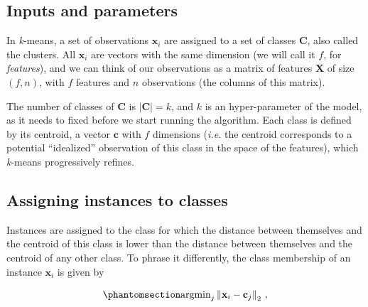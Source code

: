\documentclass[
  letterpaper,
]{scrbook}
\begin{document}
\subsection{Inputs and parameters}\label{inputs-and-parameters}


In \emph{k}-means, a set of observations \(\mathbf{x}_i\) are assigned
to a set of classes \(\mathbf{C}\), also called the clusters. All
\(\mathbf{x}_i\) are vectors with the same dimension (we will call it
\(f\), for \emph{features}), and we can think of our observations as a
matrix of features \(\mathbf{X}\) of size \((f, n)\), with \(f\)
features and \(n\) observations (the columns of this matrix).

The number of classes of \(\mathbf{C}\) is \(|\mathbf{C}| = k\), and
\(k\) is an hyper-parameter of the model, as it needs to fixed before we
start running the algorithm. Each class is defined by its centroid, a
vector \(\mathbf{c}\) with \(f\) dimensions (\emph{i.e.} the centroid
corresponds to a potential ``idealized'' observation of this class in
the space of the features), which \emph{k}-means progressively refines.

\subsection{Assigning instances to
classes}\label{assigning-instances-to-classes}


Instances are assigned to the class for which the distance between
themselves and the centroid of this class is lower than the distance
between themselves and the centroid of any other class. To phrase it
differently, the class membership of an instance \(\mathbf{x}_i\) is
given by

\begin{equation}\phantomsection\label{eq-clustering-onepoint}{
\text{argmin}_j \left\|\mathbf{x}_i-\mathbf{c}_j\right\|_2 \,,
}\end{equation}
\end{document}
